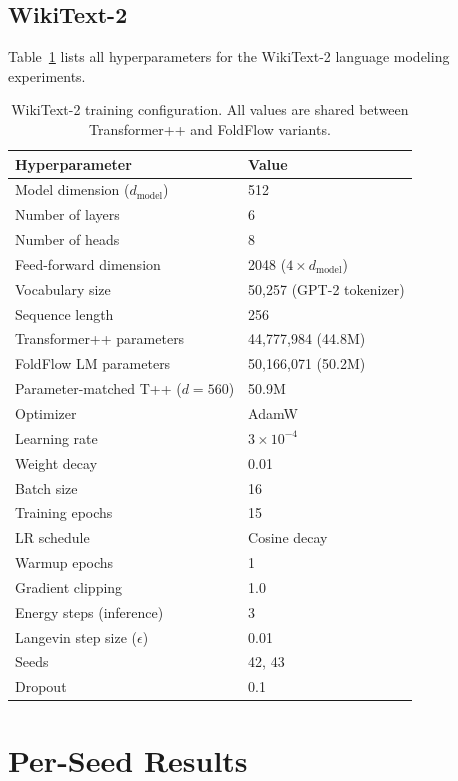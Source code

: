 \documentclass[10pt]{article}
\begin{document}
\subsection{WikiText-2}

Table~\ref{tab:wt2_config} lists all hyperparameters for the WikiText-2
language modeling experiments.

\begin{table}[h]
\centering
\caption{WikiText-2 training configuration.  All values are shared
  between Transformer++ and FoldFlow variants.}
\label{tab:wt2_config}
\small
\begin{tabular}{@{}ll@{}}
\toprule
Hyperparameter & Value \\
\midrule
Model dimension ($d_\text{model}$) & 512 \\
Number of layers & 6 \\
Number of heads & 8 \\
Feed-forward dimension & 2048 ($4 \times d_\text{model}$) \\
Vocabulary size & 50,257 (GPT-2 tokenizer) \\
Sequence length & 256 \\
\midrule
Transformer++ parameters & 44,777,984 (44.8M) \\
FoldFlow LM parameters & 50,166,071 (50.2M) \\
Parameter-matched T++ ($d{=}560$) & 50.9M \\
\midrule
Optimizer & AdamW \\
Learning rate & $3 \times 10^{-4}$ \\
Weight decay & 0.01 \\
Batch size & 16 \\
Training epochs & 15 \\
LR schedule & Cosine decay \\
Warmup epochs & 1 \\
Gradient clipping & 1.0 \\
\midrule
Energy steps (inference) & 3 \\
Langevin step size ($\epsilon$) & 0.01 \\
Seeds & 42, 43 \\
Dropout & 0.1 \\
\bottomrule
\end{tabular}
\end{table}

\section{Per-Seed Results}
\label{app:per_seed}
\end{document}
